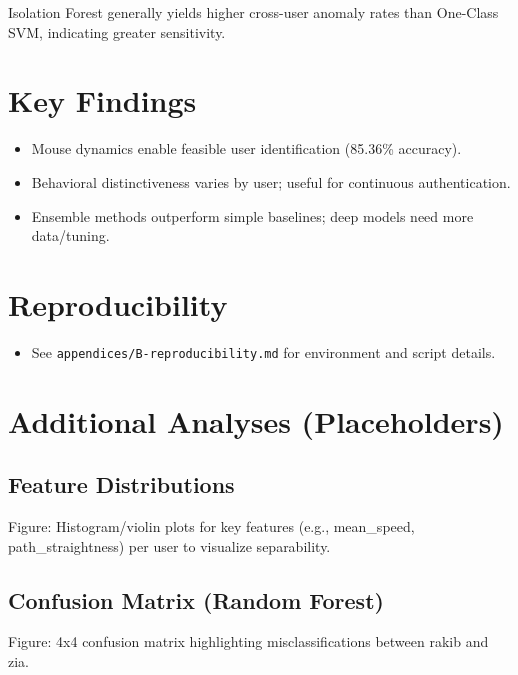 \documentclass[
  12pt,
  a4paper,
]{report}
\providecommand{\tightlist}{%
  \setlength{\itemsep}{0pt}\setlength{\parskip}{0pt}}
\begin{document}
Isolation Forest generally yields higher cross-user anomaly rates than
One-Class SVM, indicating greater sensitivity.

\section{Key Findings}\label{key-findings-1}

\begin{itemize}
\tightlist
\item
  Mouse dynamics enable feasible user identification (85.36\% accuracy).
\item
  Behavioral distinctiveness varies by user; useful for continuous
  authentication.
\item
  Ensemble methods outperform simple baselines; deep models need more
  data/tuning.
\end{itemize}

\section{Reproducibility}\label{reproducibility}

\begin{itemize}
\tightlist
\item
  See \texttt{appendices/B-reproducibility.md} for environment and
  script details.
\end{itemize}

\section{Additional Analyses
(Placeholders)}\label{additional-analyses-placeholders}

\subsection{Feature Distributions}\label{feature-distributions}

Figure: Histogram/violin plots for key features (e.g., mean\_speed,
path\_straightness) per user to visualize separability.

\subsection{Confusion Matrix (Random
Forest)}\label{confusion-matrix-random-forest}

Figure: 4x4 confusion matrix highlighting misclassifications between
rakib and zia.
\end{document}
